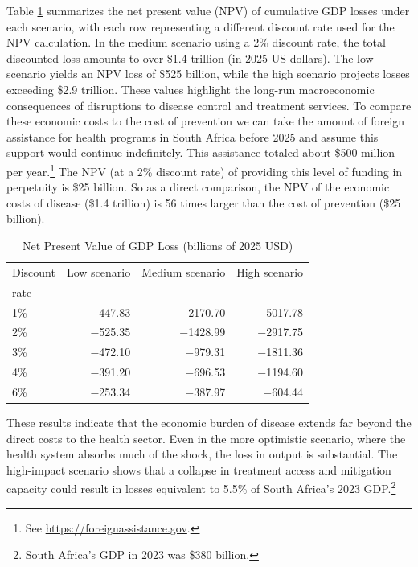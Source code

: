\documentclass[letterpaper,12pt]{article}
\theoremstyle{definition}
\begin{document}
\begin{spacing}{1.5}
Table \ref{tab:NPVLosses} summarizes the net present value (NPV) of cumulative GDP losses under each scenario, with each row representing a different discount rate used for the NPV calculation. In the medium scenario using a 2\% discount rate, the total discounted loss amounts to over \$\num{1.4} trillion (in 2025 US dollars). The low scenario yields an NPV loss of \$525 billion, while the high scenario projects losses exceeding \$\num{2.9} trillion. These values highlight the long-run macroeconomic consequences of disruptions to disease control and treatment services. To compare these economic costs to the cost of prevention we can take the amount of foreign assistance for health programs in South Africa before 2025 and assume this support would continue indefinitely. This assistance totaled about \$500 million per year.\footnote{See \href{https://foreignassistance.gov}{https://foreignassistance.gov}.} The NPV (at a 2\% discount rate) of providing this level of funding in perpetuity is \$25 billion. So as a direct comparison, the NPV of the economic costs of disease (\$\num{1.4} trillion) is 56 times larger than the cost of prevention (\$25 billion).

\begin{table}[H] \centering \captionsetup{width=6.0in}
  \caption{\label{tab:NPVLosses}Net Present Value of GDP Loss (billions of 2025 USD)}
  \begin{tabular}{lrrr}
    \hline\hline
    Discount & Low scenario & Medium scenario & High scenario \\[-1.5mm]
    rate & \citet{Brink2025} & \citet{Gandhi2025} & \citet{KS2025} \\
    \hline\hline
    1\% & \num{-447.83} & \num{-2170.70} & \num{-5017.78} \\
    2\% & \num{-525.35} & \num{-1428.99} & \num{-2917.75} \\
    3\% & \num{-472.10} & \num{-979.31} & \num{-1811.36} \\
    4\% & \num{-391.20} & \num{-696.53} & \num{-1194.60} \\
    6\% & \num{-253.34} & \num{-387.97} & \num{-604.44} \\
    \hline\hline
  \end{tabular}
\end{table}

These results indicate that the economic burden of disease extends far beyond the direct costs to the health sector. Even in the more optimistic scenario, where the health system absorbs much of the shock, the loss in output is substantial. The high-impact scenario shows that a collapse in treatment access and mitigation capacity could result in losses equivalent to \num{5.5}\% of South Africa's 2023 GDP.\footnote{South Africa's GDP in 2023 was \$380 billion.}



\end{spacing}
\end{document}
